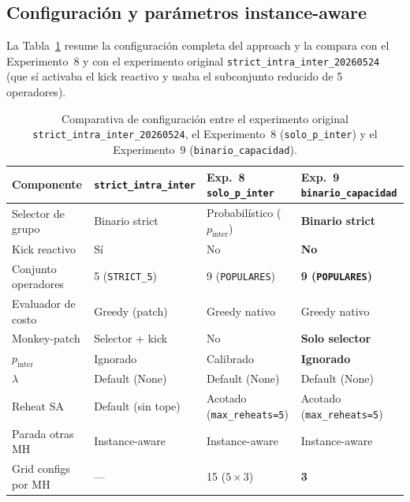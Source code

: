 \subsection{Configuración y parámetros instance-aware}

La Tabla~\ref{tab:config-binario-capacidad} resume la configuración
completa del approach y la compara con el Experimento~8 y con el
experimento original \texttt{strict\_intra\_inter\_20260524} (que sí
activaba el kick reactivo y usaba el subconjunto reducido de 5
operadores).

\begin{table}[h]
\centering
\caption{Comparativa de configuración entre el experimento original
         \texttt{strict\_intra\_inter\_20260524}, el Experimento~8
         (\texttt{solo\_p\_inter}) y el Experimento~9
         (\texttt{binario\_capacidad}).}
\label{tab:config-binario-capacidad}
\small
\begin{tabular}{llll}
\toprule
Componente &
  \texttt{strict\_intra\_inter} &
  Exp.~8 \texttt{solo\_p\_inter} &
  Exp.~9 \texttt{binario\_capacidad} \\
\midrule
Selector de grupo    & Binario strict       & Probabilístico ($p_{\text{inter}}$) & \textbf{Binario strict} \\
Kick reactivo        & Sí                   & No                                  & \textbf{No} \\
Conjunto operadores  & 5 (\texttt{STRICT\_5}) & 9 (\texttt{POPULARES})            & \textbf{9 (\texttt{POPULARES})} \\
Evaluador de costo   & Greedy (patch)       & Greedy nativo                       & Greedy nativo \\
Monkey-patch         & Selector + kick      & No                                  & \textbf{Solo selector} \\
$p_{\text{inter}}$   & Ignorado             & Calibrado                           & \textbf{Ignorado} \\
$\lambda$            & Default (None)       & Default (None)                      & Default (None) \\
Reheat SA            & Default (sin tope)   & Acotado (\texttt{max\_reheats=5})   & Acotado (\texttt{max\_reheats=5}) \\
Parada otras MH      & Instance-aware       & Instance-aware                      & Instance-aware \\
Grid configs por MH  & ---                  & 15 ($5 \times 3$)                   & \textbf{3} \\
\bottomrule
\end{tabular}
\end{table}

